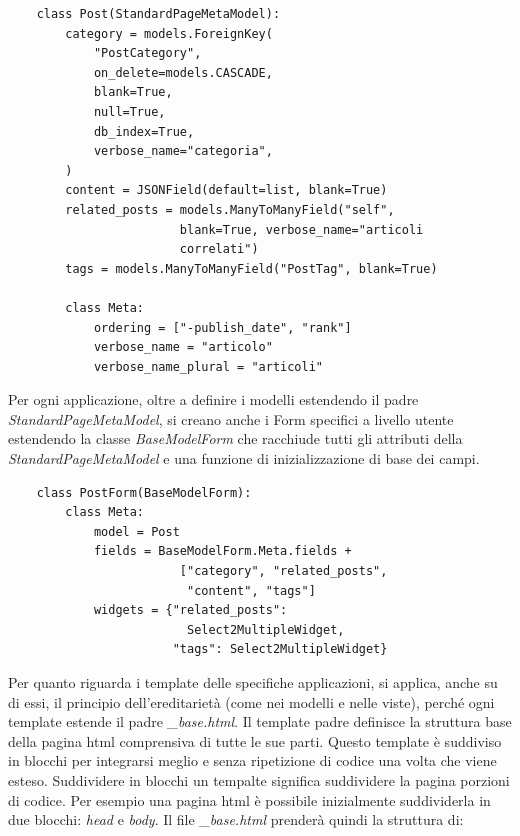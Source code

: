 \documentclass[12pt,a4paper]{article}
\begin{document}
\begin{verbatim}
    class Post(StandardPageMetaModel):
        category = models.ForeignKey(
            "PostCategory",
            on_delete=models.CASCADE,
            blank=True,
            null=True,
            db_index=True,
            verbose_name="categoria",
        )
        content = JSONField(default=list, blank=True)
        related_posts = models.ManyToManyField("self",
                        blank=True, verbose_name="articoli
                        correlati")
        tags = models.ManyToManyField("PostTag", blank=True)

        class Meta:
            ordering = ["-publish_date", "rank"]
            verbose_name = "articolo"
            verbose_name_plural = "articoli"
\end{verbatim}
Per ogni applicazione, oltre a definire i modelli estendendo il padre \textit{StandardPageMetaModel}, si creano anche i Form specifici a livello utente estendendo la classe \textit{BaseModelForm} che racchiude tutti gli attributi della \textit{StandardPageMetaModel} e una funzione di inizializzazione di base dei campi.

\begin{verbatim}
    class PostForm(BaseModelForm):
        class Meta:
            model = Post
            fields = BaseModelForm.Meta.fields +
                        ["category", "related_posts",
                         "content", "tags"]
            widgets = {"related_posts":
                         Select2MultipleWidget,
                       "tags": Select2MultipleWidget}
\end{verbatim}

Per quanto riguarda i template delle specifiche applicazioni, si applica, anche su di essi, il principio dell'ereditarietà (come nei modelli e nelle viste), perché ogni template estende il padre \textit{\_base.html}. Il template padre definisce la struttura base della pagina html comprensiva di tutte le sue parti. Questo template è suddiviso in blocchi per integrarsi meglio e senza ripetizione di codice una volta che viene esteso. Suddividere in blocchi un tempalte significa suddividere la pagina porzioni di codice. Per esempio una pagina html è possibile inizialmente suddividerla in due blocchi: \textit{head} e \textit{body}. Il file \textit{\_base.html} prenderà quindi la struttura di:
\end{document}

